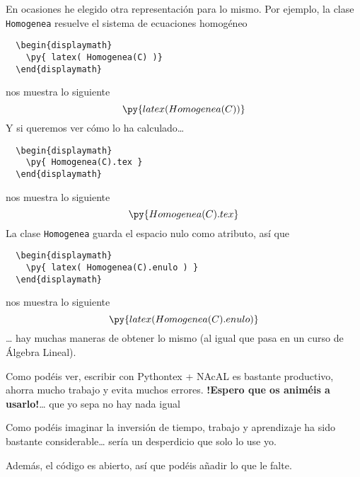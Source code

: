 \documentclass[12pt,a4paper]{article} %
\begin{document}
En ocasiones he elegido otra representación para lo mismo. Por
ejemplo, la clase \texttt{Homogenea} resuelve el sistema de ecuaciones
homogéneo
\begin{Verbatim}
  \begin{displaymath}
    \py{ latex( Homogenea(C) )}
  \end{displaymath}
\end{Verbatim}
nos muestra lo siguiente
\begin{displaymath}
  \py{ latex( Homogenea(C) )}
\end{displaymath}
Y si queremos ver cómo lo ha calculado\dots
\begin{Verbatim}
  \begin{displaymath}
    \py{ Homogenea(C).tex }
  \end{displaymath}
\end{Verbatim}
nos muestra lo siguiente
\begin{displaymath}
  \py{ Homogenea(C).tex }
\end{displaymath}
La clase \texttt{Homogenea} guarda el espacio nulo como atributo, así que 
\begin{Verbatim}
  \begin{displaymath}
    \py{ latex( Homogenea(C).enulo ) }
  \end{displaymath}
\end{Verbatim}
nos muestra lo siguiente
\begin{displaymath}
  \py{ latex( Homogenea(C).enulo ) }
\end{displaymath}
\dots{} hay muchas maneras de obtener lo mismo (al igual que pasa en
un curso de Álgebra Lineal).  \bigskip

Como podéis ver, escribir con Pythontex + NAcAL es bastante
productivo, ahorra mucho trabajo y evita muchos
errores. \textbf{!Espero que os animéis a usarlo!}\dots{} que yo sepa
no hay nada igual

Como podéis imaginar la inversión de tiempo, trabajo y aprendizaje ha
sido bastante considerable\dots{} sería un desperdicio que solo lo use
yo.  \bigskip

Además, el código es abierto, así que podéis añadir lo que le falte.
\end{document}
